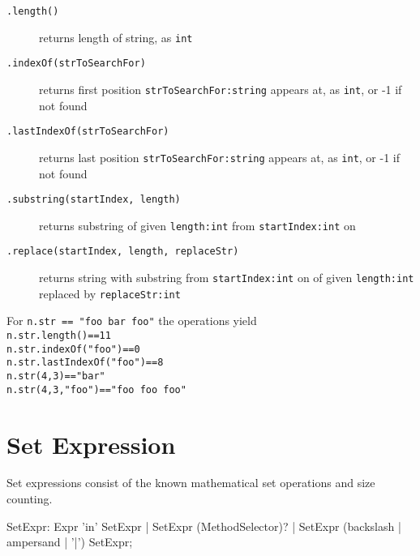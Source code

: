 \begin{description}
\item[\texttt{.length()}] returns length of string, as \texttt{int}
\item[\texttt{.indexOf(strToSearchFor)}] returns first position \texttt{strToSearchFor:string} appears at, as \texttt{int}, or -1 if not found
\item[\texttt{.lastIndexOf(strToSearchFor)}] returns last position \texttt{strToSearchFor:string} appears at, as \texttt{int}, or -1 if not found
\item[\texttt{.substring(startIndex, length)}] returns substring of given \texttt{length:int} from \texttt{startIndex:int} on
\item[\texttt{.replace(startIndex, length, replaceStr)}] returns string with substring from \texttt{startIndex:int} on of given \texttt{length:int} replaced by \texttt{replaceStr:int}
\end{description}

\begin{example}
For \texttt{n.str == "foo bar foo"} the operations yield \\
\texttt{n.str.length()==11} \\
\texttt{n.str.indexOf("foo")==0} \\
\texttt{n.str.lastIndexOf("foo")==8} \\
\texttt{n.str(4,3)=="bar"} \\
\texttt{n.str(4,3,"foo")=="foo foo foo"} \\
\end{example}


\section{Set Expression}\label{sec:setexpr}

Set expressions consist of the known mathematical set operations and size counting.

\begin{rail} 
  SetExpr: Expr 'in' SetExpr | SetExpr (MethodSelector)? | SetExpr (backslash | ampersand | '|') SetExpr;
\end{rail}

